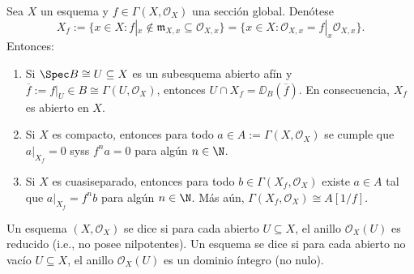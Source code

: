 \begin{prop}\label{thm:qcqs}
	Sea $X$ un esquema y $f \in \Gamma(X, \mathscr{O}_X )$ una sección global. Denótese
	$$ X_f := \{ x \in X : f|_x \notin \mathfrak{m}_{X,x} \subseteq \mathscr{O}_{X,x} \} = \{ x \in X : \mathscr{O}_{X,x} = f|_x \mathscr{O}_{X,x} \}. $$
	Entonces:
	\begin{enumerate}
		\item Si $\Spec B \cong U \subseteq X$ es un subesquema abierto afín y $\overline{f} := f|_U \in B \cong \Gamma(U, \mathscr{O}_X)$,
			entonces $U \cap X_f = \DD_B(\overline{f})$. En consecuencia, $X_f$ es abierto en $X$.
		\item Si $X$ es compacto, entonces para todo $a \in A := \Gamma(X, \mathscr{O}_X )$ se cumple que $a|_{X_f} = 0$ syss
			$f^n a = 0$ para algún $n \in \N$.
		\item Si $X$ es cuasiseparado,
			entonces para todo $b \in \Gamma(X_f, \mathscr{O}_X)$ existe $a \in A$ tal que $a|_{X_f} = f^n b$ para algún $n \in \N$.
			Más aún, $\Gamma(X_f, \mathscr{O}_X) \cong A[1/f ]$.
	\end{enumerate}
\end{prop}
\begin{mydef}
	Un esquema $(X, \mathscr{O}_X)$ se dice  si para cada abierto $U \subseteq X$, el anillo $\mathscr{O}_X(U)$
	es reducido (i.e., no posee nilpotentes).
	Un esquema se dice  si para cada abierto no vacío $U \subseteq X$, el anillo $\mathscr{O}_X(U )$ es
	un dominio íntegro (no nulo).
\end{mydef}

